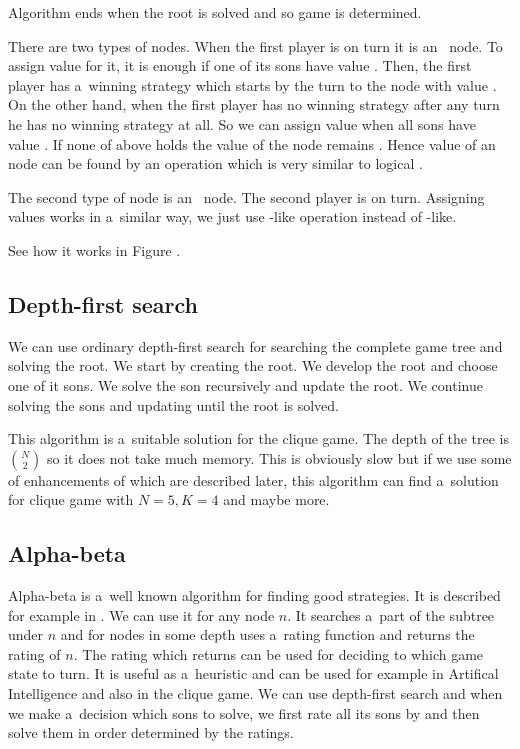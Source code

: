 Algorithm ends when the root is solved and so game is determined.

There are two types of nodes. When the first player is on turn it is an~
node. To assign value  for it, it is enough if one of its sons
have value . Then, the first player has a~winning strategy which starts by the
turn to the node with value . On the other hand, when the first player has
no winning strategy after any turn he has no winning strategy at all. So we can
assign value  when all sons have value . If none of above holds
the value of the node remains . Hence value of an~ node can be found by
an operation which is very similar to logical .

The second type of node is an~ node. The second player is on turn. Assigning values
works in a~similar way, we just use -like operation instead of -like.

See how it works in Figure .

\subsection{Depth-first search} We can use ordinary depth-first search for
searching the complete game tree and solving the root. We start by creating
the root. We develop the root and choose one of it sons. We solve the son
recursively and update the root. We continue solving the sons and updating
until the root is solved.

This algorithm is a~suitable solution for the clique game. The depth of the
tree is $N \choose 2$ so it does not take much memory. This is obviously slow
but if we use some of enhancements of  which are described later, this
algorithm can find a~solution for clique game with $N=5, K=4$ and maybe more.

\subsection{Alpha-beta}

Alpha-beta is a~well known algorithm for finding good strategies. It is described for
example in \cite{alphabeta}.
We can use it for any node $n$. It searches a~part of the subtree under $n$ and for
nodes in some depth uses a~rating function and returns the rating of $n$. The rating
which  returns can be used for deciding to which game state to turn. It
is useful as a~heuristic and can be used for example in Artifical Intelligence
and also in the clique game.
We can use depth-first search and when we make a~decision which sons
to solve, we first rate all its sons by  and then solve them in order
determined by the ratings.

